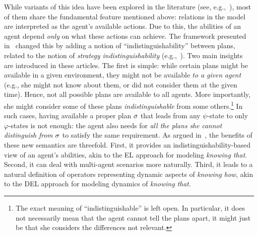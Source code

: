While variants of this idea have been explored in the literature (see, e.g.,~\cite{Li17,LiWang17,FervariHLW17,Wang19a}),
most of them share the fundamental feature mentioned above: relations in the model are interpreted as the agent's available actions. Due to this, the abilities of an agent depend \emph{only} on what these actions can achieve. The framework presented in~\cite{AFSVQ21,AFSVQ23report} changed this by adding a notion of ``indistinguishability'' between plans, related to the notion of \emph{strategy indistinguishability} (e.g.,~\cite{JamrogaH04,Belardinelli14}). Two main insights are introduced in these articles. The first is simple: while certain plans might be available in a given environment, they might not be available \emph{to a given agent} (e.g., she might not know about them, or did not consider them at the given time). Hence, not all possible plans are available to all agents.  More importantly, she might consider some of these plans \emph{indistinguishable} from some others.\footnote{The exact meaning of ``indistinguishable'' is left open. In particular, it does not necessarily mean that the agent cannot tell the plans apart, it might just be that she considers the differences not relevant.} In such cases, having available a proper plan $\sigma$ that leads from any $\psi$-state to only $\varphi$-states is not enough: the agent also needs for \emph{all the plans she cannot distinguish from $\sigma$} to satisfy the same requirement. As argued in~\cite{AFSVQ21}, the benefits of these new semantics are threefold. First, it provides an indistinguishability-based view of an agent's abilities, akin to the EL approach for modeling \emph{knowing that}. Second, it can deal with multi-agent scenarios more naturally. Third, it leads to a natural definition of operators representing dynamic aspects of \emph{knowing how}, akin to the DEL approach for modeling dynamics of \emph{knowing that}.
%
